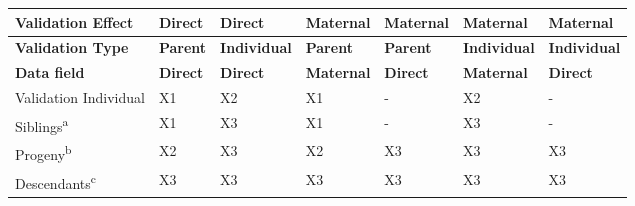 {\def\LTcaptype{none} %
\begin{longtable}[]{@{}
  >{\raggedright\arraybackslash}p{}
  >{\raggedright\arraybackslash}p{}
  >{\raggedright\arraybackslash}p{}
  >{\raggedright\arraybackslash}p{}
  >{\raggedright\arraybackslash}p{}
  >{\raggedright\arraybackslash}p{}
  >{\raggedright\arraybackslash}p{}@{}}
\toprule\noalign{}
\begin{minipage}[b]{\linewidth}\raggedright
Validation Effect
\end{minipage} & \begin{minipage}[b]{\linewidth}\raggedright
Direct
\end{minipage} & \begin{minipage}[b]{\linewidth}\raggedright
Direct
\end{minipage} & \begin{minipage}[b]{\linewidth}\raggedright
Maternal
\end{minipage} & \begin{minipage}[b]{\linewidth}\raggedright
Maternal
\end{minipage} & \begin{minipage}[b]{\linewidth}\raggedright
Maternal
\end{minipage} & \begin{minipage}[b]{\linewidth}\raggedright
Maternal
\end{minipage} \\
\midrule\noalign{}
\endhead
\bottomrule\noalign{}
\endlastfoot
\textbf{Validation Type} & \textbf{Parent} & \textbf{Individual} &
\textbf{Parent} & \textbf{Parent} & \textbf{Individual} &
\textbf{Individual} \\
\textbf{Data field} & \textbf{Direct} & \textbf{Direct} &
\textbf{Maternal} & \textbf{Direct} & \textbf{Maternal} &
\textbf{Direct} \\
Validation Individual & X1 & X2 & X1 & - & X2 & - \\
Siblings\textsuperscript{a} & X1 & X3 & X1 & - & X3 & - \\
Progeny\textsuperscript{b} & X2 & X3 & X2 & X3 & X3 & X3 \\
Descendants\textsuperscript{c} & X3 & X3 & X3 & X3 & X3 & X3 \\
\end{longtable}
}

